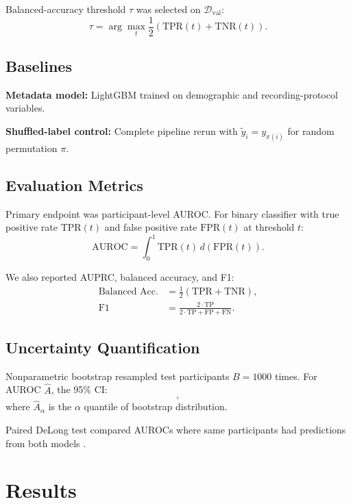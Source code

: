 \documentclass[conference]{IEEEtran}
\begin{document}
Balanced-accuracy threshold $\tau$ was selected on $\mathcal{D}_{\text{val}}$:
\begin{equation}
\tau = \arg\max_t \frac{1}{2}\left(\text{TPR}(t) + \text{TNR}(t)\right).
\end{equation}

\subsection{Baselines}

\textbf{Metadata model:} LightGBM trained on demographic and recording-protocol variables.

\textbf{Shuffled-label control:} Complete pipeline rerun with $\tilde{y}_i = y_{\pi(i)}$ for random permutation $\pi$.

\subsection{Evaluation Metrics}

Primary endpoint was participant-level AUROC. For binary classifier with true positive rate $\text{TPR}(t)$ and false positive rate $\text{FPR}(t)$ at threshold $t$:
\begin{equation}
\text{AUROC} = \int_0^1 \text{TPR}(t) \, d(\text{FPR}(t)).
\end{equation}

We also reported AUPRC, balanced accuracy, and F1:
\begin{align}
\text{Balanced Acc.} &= \frac{1}{2}(\text{TPR} + \text{TNR}), \\
\text{F1} &= \frac{2 \cdot \text{TP}}{2 \cdot \text{TP} + \text{FP} + \text{FN}}.
\end{align}

\subsection{Uncertainty Quantification}

Nonparametric bootstrap resampled test participants $B=1000$ times. For AUROC $\hat{A}$, the 95\% CI:
\begin{equation}
[\hat{A}_{0.025}, \hat{A}_{0.975}],
\end{equation}
where $\hat{A}_\alpha$ is the $\alpha$ quantile of bootstrap distribution.

Paired DeLong test compared AUROCs where same participants had predictions from both models \cite{delong1988auc}.

\section{Results}
\end{document}
